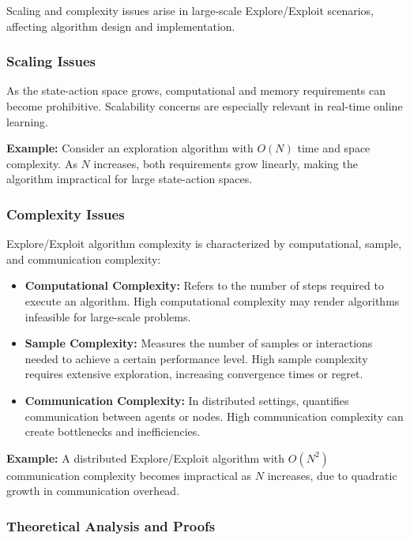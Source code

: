 \documentclass[12pt]{book} %
\begin{document}
Scaling and complexity issues arise in large-scale Explore/Exploit scenarios, affecting algorithm design and implementation.

\subsubsection{Scaling Issues}

As the state-action space grows, computational and memory requirements can become prohibitive. Scalability concerns are especially relevant in real-time online learning. 

\textbf{Example:} Consider an exploration algorithm with \(O(N)\) time and space complexity. As \(N\) increases, both requirements grow linearly, making the algorithm impractical for large state-action spaces.

\subsubsection{Complexity Issues}

Explore/Exploit algorithm complexity is characterized by computational, sample, and communication complexity:

\begin{itemize}
    \item \textbf{Computational Complexity:} Refers to the number of steps required to execute an algorithm. High computational complexity may render algorithms infeasible for large-scale problems.
    \item \textbf{Sample Complexity:} Measures the number of samples or interactions needed to achieve a certain performance level. High sample complexity requires extensive exploration, increasing convergence times or regret.
    \item \textbf{Communication Complexity:} In distributed settings, quantifies communication between agents or nodes. High communication complexity can create bottlenecks and inefficiencies.
\end{itemize}

\textbf{Example:} A distributed Explore/Exploit algorithm with \(O(N^2)\) communication complexity becomes impractical as \(N\) increases, due to quadratic growth in communication overhead.

\subsubsection{Theoretical Analysis and Proofs}
\end{document}
